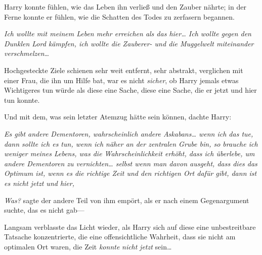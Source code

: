 Harry konnte fühlen, wie das Leben ihn verließ und den Zauber nährte; in der Ferne konnte er fühlen, wie die Schatten des Todes zu zerfasern begannen.

\emph{Ich wollte mit meinem Leben mehr erreichen als das hier… Ich wollte gegen den Dunklen Lord kämpfen, ich wollte die Zauberer- und die Muggelwelt miteinander verschmelzen…}

Hochgesteckte Ziele schienen sehr weit entfernt, sehr abstrakt, verglichen mit einer Frau, die ihn um Hilfe bat, war es nicht \emph{sicher}, ob Harry jemals etwas Wichtigeres tun würde als diese eine Sache, diese eine Sache, die er jetzt und hier tun konnte.

Und mit dem, was sein letzter Atemzug hätte sein können, dachte Harry:

\emph{Es gibt andere Dementoren, wahrscheinlich andere Askabans… wenn ich das tue, dann sollte ich es tun, wenn ich näher an der zentralen Grube bin, so brauche ich weniger meines Lebens, was die Wahrscheinlichkeit erhöht, dass ich überlebe, um andere Dementoren zu vernichten… selbst wenn man davon ausgeht, dass dies das Optimum ist, wenn es die richtige Zeit und den richtigen Ort dafür gibt, dann ist es nicht jetzt und hier, }

\emph{Was?} sagte der andere Teil von ihm empört, als er nach einem Gegenargument suchte, das es nicht gab—

Langsam verblasste das Licht wieder, als Harry sich auf diese eine unbestreitbare Tatsache konzentrierte, die eine offensichtliche Wahrheit, dass sie nicht am optimalen Ort waren, die Zeit \emph{konnte} \emph{nicht} \emph{jetzt} sein…

